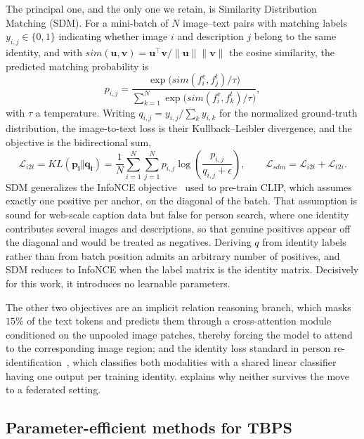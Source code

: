 The principal one, and the only one we retain, is Similarity Distribution Matching (SDM). For a mini-batch of $N$ image--text pairs with matching labels $y_{i,j}\in\{0,1\}$ indicating whether image $i$ and description $j$ belong to the same identity, and with $sim(\mathbf{u},\mathbf{v})=\mathbf{u}^{\top}\mathbf{v}/\lVert\mathbf{u}\rVert\lVert\mathbf{v}\rVert$ the cosine similarity, the predicted matching probability is
\begin{equation}\label{eq:sdm-p}
p_{i,j}=\frac{\exp\!\big(sim(f^{v}_{i},f^{t}_{j})/\tau\big)}{\sum_{k=1}^{N}\exp\!\big(sim(f^{v}_{i},f^{t}_{k})/\tau\big)},
\end{equation}
with $\tau$ a temperature. Writing $q_{i,j}=y_{i,j}/\sum_{k}y_{i,k}$ for the normalized ground-truth distribution, the image-to-text loss is their Kullback--Leibler divergence, and the objective is the bidirectional sum,
\begin{equation}\label{eq:sdm}
\mathcal{L}_{i2t}=KL(\mathbf{p_{i}}\Vert\mathbf{q_{i}})=\frac{1}{N}\sum_{i=1}^{N}\sum_{j=1}^{N}p_{i,j}\log\!\left(\frac{p_{i,j}}{q_{i,j}+\epsilon}\right),\qquad
\mathcal{L}_{sdm}=\mathcal{L}_{i2t}+\mathcal{L}_{t2i}.
\end{equation}
SDM generalizes the InfoNCE objective~\citep{oord2019representationlearningcontrastivepredictive} used to pre-train CLIP, which assumes exactly one positive per anchor, on the diagonal of the batch. That assumption is sound for web-scale caption data but false for person search, where one identity contributes several images and descriptions, so that genuine positives appear off the diagonal and would be treated as negatives. Deriving $q$ from identity labels rather than from batch position admits an arbitrary number of positives, and SDM reduces to InfoNCE when the label matrix is the identity matrix. Decisively for this work, it introduces no learnable parameters.

The other two objectives are an implicit relation reasoning branch, which masks $15\%$ of the text tokens and predicts them through a cross-attention module conditioned on the unpooled image patches, thereby forcing the model to attend to the corresponding image region; and the identity loss standard in person re-identification~\citep{zheng2021dualpathconvolutionalimagetextembeddings}, which classifies both modalities with a shared linear classifier having one output per training identity.  explains why neither survives the move to a federated setting.

\subsection{Parameter-efficient methods for TBPS}\label{sec:petl}

